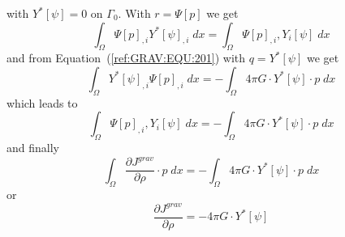 with $Y^*[\psi]=0$ on $\Gamma_0$. With $r=\Psi[p]$ we get
\begin{equation}\label{ref:GRAV:EQU:202dd}
\int_{\Omega} \Psi[p]_{,i} Y^*[\psi]_{,i} \; dx  =  \int_{\Omega} \Psi[p]_{,i} ,Y_i[\psi]  \; dx
\end{equation} 
and from Equation~(\ref{ref:GRAV:EQU:201}) with $q=Y^*[\psi]$ we get
\begin{equation}\label{ref:GRAV:EQU:20e}
\int_{\Omega} Y^*[\psi]_{,i}  \Psi[p]_{,i} \; dx  = - \int_{\Omega}  4\pi G \cdot Y^*[\psi] \cdot  p\;  dx  
\end{equation}
which leads to 
\begin{equation}\label{ref:GRAV:EQU:20ee}
\int_{\Omega} \Psi[p]_{,i} ,Y_i[\psi]  \; dx  = - \int_{\Omega}  4\pi G \cdot Y^*[\psi] \cdot  p \; dx  
\end{equation}
and finally
\begin{equation}\label{ref:GRAV:EQU:201a}
\int_{\Omega}   \frac{\partial J^{grav}}{\partial \rho} \cdot p \;  dx  = - \int_{\Omega}  
4\pi G \cdot Y^*[\psi] \cdot  p \; dx  
\end{equation} 
or 
\begin{equation}\label{ref:GRAV:EQU:201b}
\frac{\partial J^{grav}}{\partial \rho}  =- 4\pi G \cdot Y^*[\psi]
\end{equation} 

